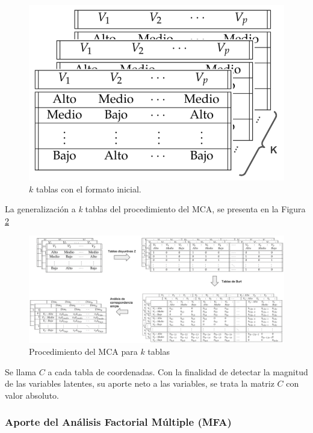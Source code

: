 \documentclass[water,article,submit,moreauthors,pdftex]{mdpi}
\begin{document}
\begin{figure}[!ht]



\begin{center}\includegraphics[width=0.4\linewidth,]{ktables} \end{center}

\caption{$k$ tablas con el formato inicial.}

\label{fig:ktables}
\end{figure}

La generalización a \emph{k} tablas del procedimiento del MCA, se
presenta en la Figura \ref{fig:MCAk}

\begin{figure}[!h]


\begin{center}\includegraphics[width=0.9\linewidth,]{ktablesMCA} \end{center}

\caption{Procedimiento del MCA para $k$ tablas}

\label{fig:MCAk}
\end{figure}

Se llama \(C\) a cada tabla de coordenadas. Con la finalidad de detectar
la magnitud de las variables latentes, su aporte neto a las variables,
se trata la matriz \(C\) con valor absoluto.

\hypertarget{aporte-del-anuxe1lisis-factorial-muxfaltiple-mfa}{%
\subsubsection{Aporte del Análisis Factorial Múltiple
(MFA)}\label{aporte-del-anuxe1lisis-factorial-muxfaltiple-mfa}}
\end{document}
